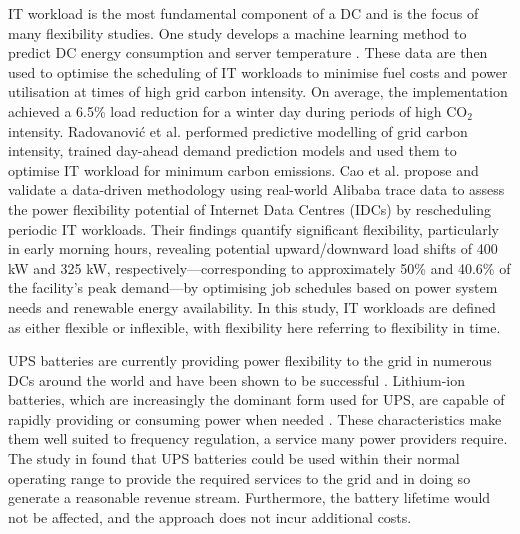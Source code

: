 \documentclass[lettersize,journal]{IEEEtran}
\providecommand{\DIFadd}[1]{{\color{blue}#1}}
\providecommand{\DIFaddbegin}{}
\providecommand{\DIFaddend}{}
\begin{document}
IT workload is the most fundamental component of a DC and is the focus  \DIFaddbegin \DIFadd{of }\DIFaddend many flexibility studies. One study develops a machine learning method to predict DC energy consumption and server temperature  \DIFaddbegin \DIFadd{\cite{Misaghian2023TIA}}\DIFaddend . These data are then used to optimise the scheduling of IT workloads to minimise fuel costs and power utilisation at times of high grid carbon intensity. On average, the implementation achieved a 6.5\% load reduction for a winter day during periods of high CO$_2$ intensity. Radovanović et al. \cite{radovanovic2022carbon}  performed predictive modelling of grid carbon intensity, trained day-ahead demand prediction models and used them to optimise IT workload for minimum carbon emissions.
Cao et al.  \DIFaddbegin \DIFadd{\cite{Cao2022ApEn} }\DIFaddend propose and validate a data-driven methodology using real-world Alibaba trace data to assess the power flexibility potential of Internet Data Centres (IDCs) by rescheduling periodic IT workloads. Their findings quantify significant flexibility, particularly in early morning hours, revealing potential upward/downward load shifts of  \DIFaddbegin \DIFadd{400 kW and 325 kW}\DIFaddend , respectively—corresponding to approximately 50\% and 40.6\% of the facility's peak demand—by optimising job schedules based on power system needs and renewable energy availability. In this study, IT workloads are defined as either flexible or inflexible, with flexibility here referring to flexibility in time.

UPS batteries are currently providing power flexibility to the grid in numerous DCs around the world and have been shown to be successful \cite{alapera2019fast,roach2022microsoft,Anghel_2023}. Lithium-ion batteries, which are increasingly the dominant form used for UPS, are capable of rapidly providing or consuming power when needed \cite{alapera2018data}. These characteristics make them well suited to frequency regulation, a service many power providers require.  \DIFaddbegin \DIFadd{The study in \cite{alapera2018data} found that }\DIFaddend UPS batteries could be used within their normal operating range to provide the required services to the grid and in doing so generate a reasonable revenue stream. Furthermore, the battery lifetime would not be affected, and the approach does not  \DIFaddbegin \DIFadd{incur additional costs}\DIFaddend .
\end{document}
